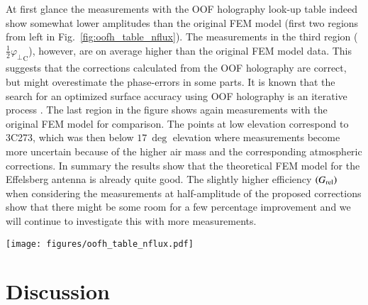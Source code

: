 \documentclass[
    ]
    {aa}
\begin{document}
    At first glance the measurements with the OOF holography look-up table indeed show somewhat lower amplitudes than the original FEM model (first two regions from left in Fig.~\ref{fig:oofh_table_nflux}). The measurements in the third region ($\frac{1}{2}{\varphi_\bot}_\text{C}$), however, are on average higher than the original FEM model data. This suggests that the corrections calculated from the OOF holography are correct, but might overestimate the phase-errors in some parts. It is known that the search for an optimized surface accuracy using OOF holography is an iterative process \citep{2007A&A...465..685N}. The last region in the figure shows again measurements with the original FEM model for comparison. The points at low elevation correspond to 3C273, which was then below $\SI{17}{\deg}$ elevation where measurements become more uncertain because of the higher air mass and the corresponding atmospheric corrections. In summary the results show that the theoretical FEM model for the Effelsberg antenna is already quite good. The slightly higher efficiency $\del{G_\text{rel}}$ when considering the measurements at half-amplitude of the proposed corrections show that there might be some room for a few percentage improvement and we will continue to investigate this with more measurements.

    \begin{figure*}[t]
        \centering
        \texttt{[image: figures/oofh\_table\_nflux.pdf]}
        \caption{The relative gain for the selected sources at different elevations observed with the original FEM model actuator table, and with the modified tables. The error bars of the data points combine the individual error of the Gaussian fit to the cross-scans and the calibration uncertainty of the main calibrator 3C286. For the modified tables the full corrections calculated by the OOF holography (gravitational model) were applied and as a test also only half of the amount of the corrections were applied. The different scenarios are separated by the gray region: FEM look-up table (default) ${\varphi_\bot}_\text{FEM}$, new look-up table ${\varphi_\bot}_\text{C}$, and half new look-up table $\frac{1}{2}{\varphi_\bot}_\text{C}$. The dashed horizontal line shows a relative gain of $G_\text{rel}=\num{1}$, corresponding to no difference to the FEM model.}
        \label{fig:oofh_table_nflux}
    \end{figure*}


    \section{Discussion} 
    \label{sec:discussion}
\end{document}
